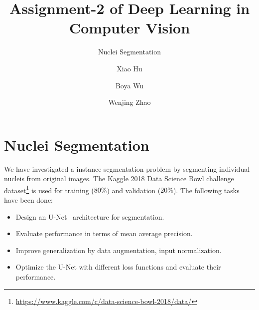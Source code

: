 \documentclass[runningheads]{llncs}
\begin{document}
%
\title{Assignment-2 of Deep Learning in Computer Vision}
\subtitle{Nuclei Segmentation}
%
%
\author{Xiao Hu \and
Boya Wu \and
Wenjing Zhao
}

%
\maketitle              %
%

%
%
%
\section{Nuclei Segmentation}
We have investigated a instance segmentation problem by segmenting individual nucleis from original images. The Kaggle 2018 Data Science Bowl challenge dataset\footnote{\url{https://www.kaggle.com/c/data-science-bowl-2018/data/}} is used for training ($80\%$) and validation ($20\%$). The following tasks have been done:
\begin{itemize}
    \item Design an U-Net~\cite{ronneberger2015u} architecture for segmentation.
    \item Evaluate performance in terms of mean average precision.
    \item Improve generalization by data augmentation, input normalization.
    \item Optimize the U-Net with different loss functions and evaluate their performance.
\end{itemize}
\end{document}
